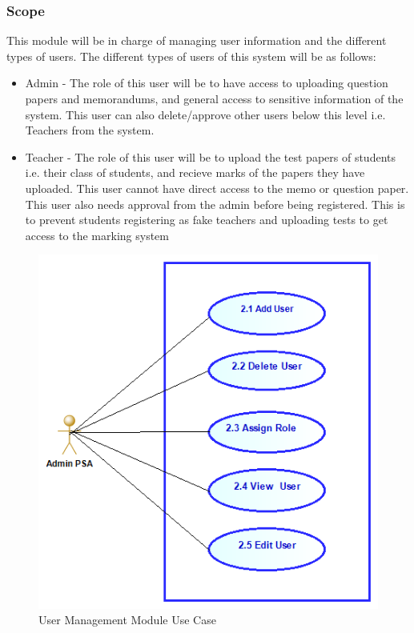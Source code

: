 \documentclass{article}
\begin{document}
		\subsubsection{Scope}
		This module will be in charge of managing user information and the different types of users. The different
		types of users of this system will be as follows:
			\begin{itemize}
				\item{Admin - The role of this user will be to have access to uploading question papers and memorandums,
					  	and general access to sensitive information of the system. This user can also delete/approve other
						users below this level i.e. Teachers from the system.}
				\item{Teacher - The role of this user will be to upload the test papers of students i.e. their class of students,
						and recieve marks of the papers they have uploaded. This user cannot have direct access to the memo
						or question paper. This user also needs approval from the admin before being registered. This is to prevent 
						students registering as fake teachers and uploading tests to get access to the marking system}
			\end{itemize}
			
			\begin{figure}[h]
				\includegraphics[scale=0.6]{Images/User_Management_Module/UserManagementModuleUseCase}
				\caption{User Management Module Use Case}
			\end{figure}
			
\end{document}
